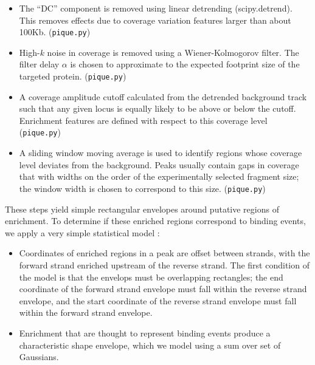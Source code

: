 \documentclass{bioinfo}
\begin{document}
{\begin{methods}
\begin{itemize}
\item The ``DC'' component is removed using linear detrending
  (scipy.detrend). This removes effects due to coverage variation
  features larger than about 100Kb. (\texttt{pique.py})

\item High-$k$ noise in coverage is removed using a Wiener-Kolmogorov
  filter. The filter delay $\alpha$ is chosen to approximate to the
  expected footprint size of the targeted protein. (\texttt{pique.py})

\item A coverage amplitude cutoff calculated from the detrended
  background track such that any given locus is equally likely to be
  above or below the cutoff. Enrichment features are defined with
  respect to this coverage level (\texttt{pique.py})

\item A sliding window moving average is used to identify regions
  whose coverage level deviates from the background. Peaks usually
  contain gaps in coverage that with widths on the order of the
  experimentally selected fragment size; the window width is chosen to
  correspond to this size. (\texttt{pique.py})



\end{itemize}

These steps yield simple rectangular envelopes around putative regions
of enrichment. To determine if these enriched regions correspond to
binding events, we apply a very simple statistical model :

\begin{itemize}

\item Coordinates of enriched regions in a peak are offset between
  strands, with the forward strand enriched upstream of the reverse
  strand. The first condition of the model is that the envelops must
  be overlapping rectangles; the end coordinate of the forward strand
  envelope must fall within the reverse strand envelope, and the
  start coordinate of the reverse strand envelope must fall within the
  forward strand envelope. 

\item Enrichment that are thought to represent binding events produce
  a characteristic shape envelope, which we model using a sum over set
  of Gaussians.

\end{itemize}


\end{methods}}
\end{document}
